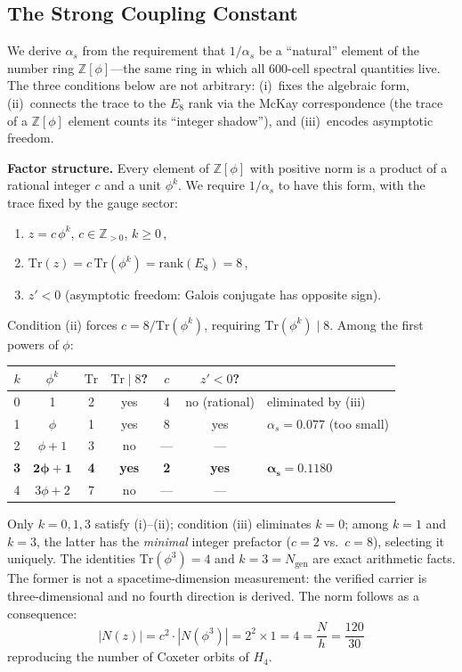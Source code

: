 \documentclass[12pt,a4paper]{article}
\theoremstyle{definition}
\begin{document}
\subsection{The Strong Coupling Constant}

We derive $\alpha_s$ from the requirement that $1/\alpha_s$ be a ``natural'' element of the number ring $\mathbb{Z}[\phi]$---the same ring in which all 600-cell spectral quantities live.  The three conditions below are not arbitrary: (i)~fixes the algebraic form, (ii)~connects the trace to the $E_8$ rank via the McKay correspondence (the trace of a $\mathbb{Z}[\phi]$ element counts its ``integer shadow''), and (iii)~encodes asymptotic freedom.

\textbf{Factor structure.}  Every element of $\mathbb{Z}[\phi]$ with positive norm is a product of a rational integer $c$ and a unit $\phi^k$.  We require $1/\alpha_s$ to have this form, with the trace fixed by the gauge sector:
\begin{enumerate}
\item[(i)] $z = c\,\phi^k$, \;$c \in \mathbb{Z}_{>0}$, \;$k \geq 0$\,,
\item[(ii)] $\mathrm{Tr}(z) = c\,\mathrm{Tr}(\phi^k) = \mathrm{rank}(E_8) = 8$\,,
\item[(iii)] $z' < 0$ \;(asymptotic freedom: Galois conjugate has opposite sign).
\end{enumerate}
Condition (ii) forces $c = 8/\text{Tr}(\phi^k)$, requiring $\text{Tr}(\phi^k) \mid 8$.  Among the first powers of $\phi$:
\begin{center}
\begin{tabular}{ccccccl}
\toprule
$k$ & $\phi^k$ & $\text{Tr}$ & $\text{Tr} \mid 8$? & $c$ & $z'<0$? & \\
\midrule
0 & 1         & 2 & yes & 4 & no (rational) & eliminated by (iii) \\
1 & $\phi$    & 1 & yes & 8 & yes & $\alpha_s = 0.077$ (too small) \\
2 & $\phi+1$  & 3 & no  & --- & --- & \\
\textbf{3} & $\boldsymbol{2\phi+1}$  & \textbf{4} & \textbf{yes} & \textbf{2} & \textbf{yes} & $\boldsymbol{\alpha_s = 0.1180}$ \\
4 & $3\phi+2$ & 7 & no  & --- & --- & \\
\bottomrule
\end{tabular}
\end{center}
Only $k = 0, 1, 3$ satisfy (i)--(ii); condition (iii) eliminates $k=0$; among $k=1$ and $k=3$, the latter has the \emph{minimal} integer prefactor ($c = 2$ vs.\ $c = 8$), selecting it uniquely.  The identities $\text{Tr}(\phi^3)=4$ and $k=3=N_{\text{gen}}$ are exact arithmetic facts.  The former is not a spacetime-dimension measurement: the verified carrier is three-dimensional and no fourth direction is derived.  The norm follows as a consequence:
\begin{equation}
|N(z)| = c^2 \cdot |N(\phi^3)| = 2^2 \times 1 = 4 = \frac{N}{h} = \frac{120}{30}
\end{equation}
reproducing the number of Coxeter orbits of $H_4$.
\end{document}
